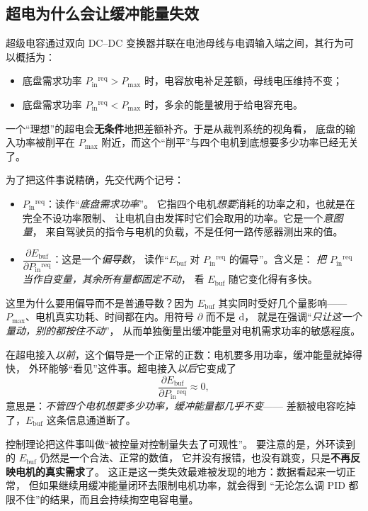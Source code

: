 \documentclass[cn,blue,11pt,device=normal]{elegantnote}
\newcommand{\Pin}{P_{\mathrm{in}}{}}
\newcommand{\Ebuf}{E_{\mathrm{buf}}{}}
\newcommand{\Pmax}{P_{\max}{}}
\newcommand{\dd}{\mathrm{d}}
\begin{document}
\subsection{超电为什么会让缓冲能量失效}

超级电容通过双向 DC--DC 变换器并联在电池母线与电调输入端之间，其行为可以概括为：
\begin{itemize}
  \item 底盘需求功率 $\Pin^{\mathrm{req}} > \Pmax$ 时，电容放电补足差额，母线电压维持不变；
  \item 底盘需求功率 $\Pin^{\mathrm{req}} < \Pmax$ 时，多余的能量被用于给电容充电。
\end{itemize}

一个“理想”的超电会\textbf{无条件}地把差额补齐。于是从裁判系统的视角看，
底盘的输入功率被削平在 $\Pmax$ 附近，而这个“削平”与四个电机到底想要多少功率已经无关了。

为了把这件事说精确，先交代两个记号：

\begin{itemize}
  \item $\Pin^{\mathrm{req}}$：读作“\emph{底盘需求功率}”。
  它指四个电机\emph{想要}消耗的功率之和，也就是在完全不设功率限制、
  让电机自由发挥时它们会取用的功率。它是一个\emph{意图量}，
  来自驾驶员的指令与电机的负载，不是任何一路传感器测出来的值。
  \item $\dfrac{\partial \Ebuf}{\partial \Pin^{\mathrm{req}}}$：这是一个\emph{偏导数}，
  读作“$\Ebuf$ 对 $\Pin^{\mathrm{req}}$ 的偏导”。含义是：
  \emph{把 $\Pin^{\mathrm{req}}$ 当作自变量，其余所有量都固定不动}，
  看 $\Ebuf$ 随它变化得有多快。
\end{itemize}

这里为什么要用偏导而不是普通导数？因为 $\Ebuf$ 其实同时受好几个量影响——
$\Pmax$、电机真实功耗、时间都在内。用符号 $\partial$ 而不是 $\dd$，
就是在强调“\emph{只让这一个量动，别的都按住不动}”，
从而单独衡量出缓冲能量对电机需求功率的敏感程度。

在超电接入\emph{以前}，这个偏导是一个正常的正数：电机要多用功率，缓冲能量就掉得快，
外环能够“看见”这件事。超电接入\emph{以后}它变成了
\begin{equation}\label{eq:bufdecouple}
  \frac{\partial \Ebuf}{\partial \Pin^{\mathrm{req}}} \approx 0 ,
\end{equation}
意思是：\emph{不管四个电机想要多少功率，缓冲能量都几乎不变}——
差额被电容吃掉了，$\Ebuf$ 这条信息通道断了。

控制理论把这件事叫做“被控量对控制量失去了可观性”。
要注意的是，外环读到的 $\Ebuf$ 仍然是一个合法、正常的数值，
它并没有报错，也没有跳变，只是\textbf{不再反映电机的真实需求}了。
这正是这一类失效最难被发现的地方：数据看起来一切正常，
但如果继续用缓冲能量闭环去限制电机功率，就会得到
“无论怎么调 PID 都限不住”的结果，而且会持续掏空电容电量。
\end{document}
